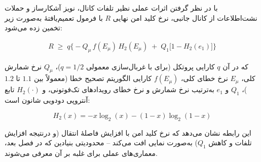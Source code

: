 با در نظر گرفتن اثرات عملی نظیر تلفات کانال، نویز آشکارساز و حملات نشت‌اطلاعات از کانال جانبی، نرخ کلید امن نهایی $R$ با فرمول تعمیم‌یافتهٔ   به‌صورت زیر تخمین زده می‌شود:

\begin{align}
\label{eq:gllp}
R \;\geq\; q \Big\{ -Q_{\mu}\, f(E_{\mu})\, H_2(E_{\mu}) \;+\; Q_1 \big[1 - H_2(e_1)\big] \Big\}
\end{align}

که در آن $q$ کارایی پروتکل (برای  با غربال‌سازی معمولی $q=1/2$)، $Q_{\mu}$ نرخ شمارش کلی، $E_{\mu}$ نرخ خطای کلی، $f(E_{\mu})$ کارایی الگوریتم تصحیح خطا (معمولاً بین $1.1$ تا $1.2$)، $Q_1$ و $e_1$ به‌ترتیب نرخ شمارش و نرخ خطای رویدادهای تک‌فوتونی، و $H_2(\cdot)$ تابع آنتروپی دودویی شانون است:

\begin{equation}
H_2(x) = -x\log_2(x) - (1-x)\log_2(1-x)
\end{equation}

این رابطه نشان می‌دهد که نرخ کلید امن با افزایش فاصلهٔ انتقال (و درنتیجه افزایش تلفات و کاهش $Q_1$) به‌صورت نمایی افت می‌کند -- محدودیتی بنیادین که در فصل بعد، معماری‌های عملی برای غلبه بر آن معرفی می‌شوند.

